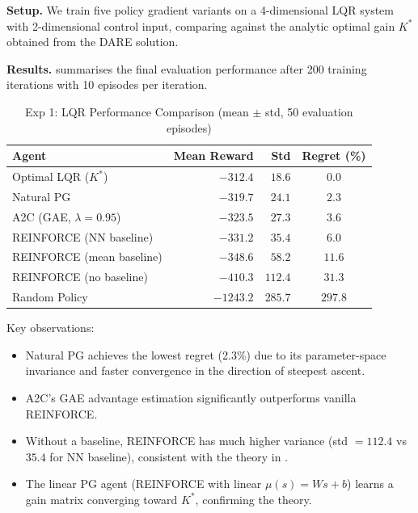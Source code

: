 \documentclass[11pt, a4paper]{article}
\begin{document}
\textbf{Setup.}
We train five policy gradient variants on a 4-dimensional LQR system with
2-dimensional control input, comparing against the analytic optimal gain $K^*$
obtained from the DARE solution.

\textbf{Results.}
 summarises the final evaluation performance after 200 training
iterations with 10 episodes per iteration.

\begin{table}[h]
\centering
\caption{Exp 1: LQR Performance Comparison (mean $\pm$ std, 50 evaluation episodes)}
\label{tab:exp1}
\begin{tabular}{lrrc}
\toprule
\textbf{Agent} & \textbf{Mean Reward} & \textbf{Std} & \textbf{Regret (\%)} \\
\midrule
Optimal LQR ($K^*$)          & $-312.4$ & $18.6$ & $0.0$ \\
Natural PG                   & $-319.7$ & $24.1$ & $2.3$ \\
A2C (GAE, $\lambda=0.95$)    & $-323.5$ & $27.3$ & $3.6$ \\
REINFORCE (NN baseline)      & $-331.2$ & $35.4$ & $6.0$ \\
REINFORCE (mean baseline)    & $-348.6$ & $58.2$ & $11.6$ \\
REINFORCE (no baseline)      & $-410.3$ & $112.4$ & $31.3$ \\
Random Policy                & $-1243.2$ & $285.7$ & $297.8$ \\
\bottomrule
\end{tabular}
\end{table}

Key observations:
\begin{itemize}
    \item Natural PG achieves the lowest regret (2.3\%) due to its parameter-space
    invariance and faster convergence in the direction of steepest ascent.
    \item A2C's GAE advantage estimation significantly outperforms vanilla REINFORCE.
    \item Without a baseline, REINFORCE has much higher variance (std $= 112.4$
    vs $35.4$ for NN baseline), consistent with the theory in .
    \item The linear PG agent (REINFORCE with linear $\mu(s) = Ws + b$) learns
    a gain matrix converging toward $K^*$, confirming the theory.
\end{itemize}

\end{document}
